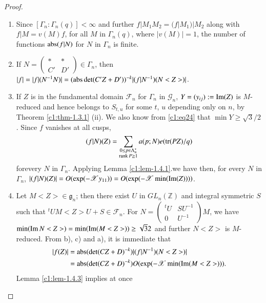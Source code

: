 \begin{proof}
\begin{enumerate}
\renewcommand{\theenumi}{\alph{enumi}}
\renewcommand{\labelenumi}{(\theenumi)}
\item Since $[\Gamma_{n}:\Gamma_{n}(q)]<\infty$ and further
  $f|M_{1}M_{2}=(f|M_{1})|M_{2}$ along with $f|M=v(M)f$, for all $M$
  in $\Gamma_{n}(q)$, where $|v(M)|=1$, the number of functions
  $\operatorname{abs}(f|N)$ for $N$ in $\Gamma_{n}$ is finite.

\item If $N=\left(\begin{smallmatrix} \ast & \ast\\ C' & D'
\end{smallmatrix}\right)\in\Gamma_{n}$, then
  $|f|=|f|(N^{-1}N)|=(\operatorname{abs}\det(C'Z+D'))^{-k}|(f|N^{-1})(N<Z>)|$.

\item If $Z$ is in the fundamental domain $\mathcal{F}_{n}$ for
  $\Gamma_{n}$ in $\mathscr{G}_{n}$, $Y=(y_{ij}):=\operatorname{Im}(Z)$ is
  $M$-reduced and hence belongs to $S_{t,u}$ for some $t$, $u$
  depending only on $n$, by Theorem \ref{c1:thm-1.3.1} (ii). We also know
  from \eqref{c1:eq24} that $\min Y\geq \sqrt{3}/2$. Since $f$ vanishes
  at all cusps,
$$
(f|N)(Z)=\sum\limits_{\substack{0\leq p\in \Lambda_{n}^{\ast}\\ \operatorname{rank}
      P \geq 1}}a(p;N)e(\operatorname{tr}(PZ)/q) 
$$
for\pageoriginale every $N$ in $\Gamma_{n}$. Applying Lemma
\ref{c1:lem-1.4.1}.\@ we have then, for every $N$ in $\Gamma_{n}$,
$|(f|N)(Z)|=O(\exp(-\mathscr{X}y_{11}))=O(\exp(-\mathscr{X}\break
\min(\Iim(Z))))$.

\item Let $M<Z>\in\mathfrak{g}_{n}$; then there exist $U$ in
  $GL_{n}(\mathbb{Z})$ and integral symmetric $S$ such that
  ${}^{t}UM<Z>U+S\in\mathscr{F}_{n}$. For $N=\left(\begin{smallmatrix}
  {}^{t}U & SU^{-1}\\ 0 & U^{-1}
\end{smallmatrix}\right)M$, we have $\min(\operatorname{Im} N<Z>)=\min (\operatorname{Im}
  (M<Z>))\geq \sqrt{3}2$ and further $N<Z>$ is $M$-reduced. From b),
  c) and a), it is immediate that
\begin{align*}
|f(Z)| &= \operatorname{abs}(\det(CZ+D)^{-k})|(f|N^{-1})(N<Z>)|\\
&= \operatorname{abs}(\det(CZ+D)^{-k})O(\exp(-\mathscr{X}\min (\operatorname{Im}(M<Z>))).
\end{align*}
Lemma \ref{c1:lem-1.4.3} implies at once
\end{enumerate}
\end{proof}

